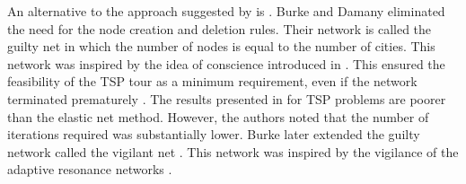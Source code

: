 \documentclass{article}
\begin{document}
An alternative to the approach suggested by \cite{angeniol1988self} is \cite{burke1992guilty}. Burke and Damany eliminated the need for the node creation and deletion rules. Their network is called the guilty net in which the number of nodes is equal to the number of cities. This network was inspired by the idea of conscience introduced in \cite{desieno1988adding}. This ensured the feasibility of the TSP tour as a minimum requirement, even if the network terminated prematurely \cite{smith1999neural}. The results presented in \cite{burke1992guilty} for TSP problems are poorer than the elastic net method. However, the authors noted that the number of iterations required was substantially lower. Burke later extended the guilty network called the vigilant net \cite{burke1994neural}. This network was inspired by the vigilance of the adaptive resonance networks \cite{carpenter1987art}.
 

\end{document}
